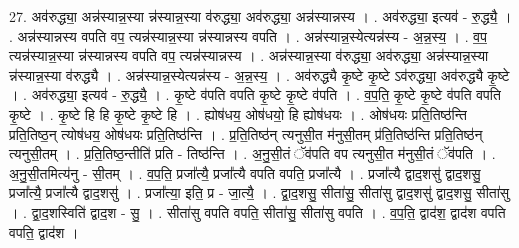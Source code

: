 \documentclass[17pt]{extarticle}
\begin{document}
27. अव॑रुद्ध्या॒ अन्न॑स्यान्न॒स्या न्न॑स्यान्न॒स्या व॑रुद्ध्या॒ अव॑रुद्ध्या॒ अन्न॑स्यान्नस्य । . अव॑रुद्ध्या॒ इत्यव॑ - रु॒द्ध्यै॒ । . अन्न॑स्यान्नस्य वपति वप॒ त्यन्न॑स्यान्न॒स्या न्न॑स्यान्नस्य वपति । . अन्न॑स्यान्न॒स्येत्यन्न॑स्य - अ॒न्न॒स्य॒ । . व॒प॒ त्यन्न॑स्यान्न॒स्या न्न॑स्यान्नस्य वपति वप॒ त्यन्न॑स्यान्नस्य । . अन्न॑स्यान्न॒स्या व॑रुद्ध्या॒ अव॑रुद्ध्या॒ अन्न॑स्यान्न॒स्या न्न॑स्यान्न॒स्या व॑रुद्ध्यै । . अन्न॑स्यान्न॒स्येत्यन्न॑स्य - अ॒न्न॒स्य॒ । . अव॑रुद्ध्यै कृ॒ष्टे कृ॒ष्टे ऽव॑रुद्ध्या॒ अव॑रुद्ध्यै कृ॒ष्टे । . अव॑रुद्ध्या॒ इत्यव॑ - रु॒द्ध्यै॒ । . कृ॒ष्टे व॑पति वपति कृ॒ष्टे कृ॒ष्टे व॑पति । . व॒प॒ति॒ कृ॒ष्टे कृ॒ष्टे व॑पति वपति कृ॒ष्टे । . कृ॒ष्टे हि हि कृ॒ष्टे कृ॒ष्टे हि । . ह्योष॑धय॒ ओष॑धयो॒ हि ह्योष॑धयः । . ओष॑धयः प्रति॒तिष्ठ॑न्ति प्रति॒तिष्ठ॒न् त्योष॑धय॒ ओष॑धयः प्रति॒तिष्ठ॑न्ति । . प्र॒ति॒तिष्ठ॑न् त्यनुसी॒त म॑नुसी॒तम् प्र॑ति॒तिष्ठ॑न्ति प्रति॒तिष्ठ॑न् त्यनुसी॒तम् । . प्र॒ति॒तिष्ठ॒न्तीति॑ प्रति - तिष्ठ॑न्ति । . अ॒नु॒सी॒तं ॅव॑पति वप त्यनुसी॒त म॑नुसी॒तं ॅव॑पति । . अ॒नु॒सी॒तमित्य॑नु - सी॒तम् । . व॒प॒ति॒ प्रजा᳚त्यै॒ प्रजा᳚त्यै वपति वपति॒ प्रजा᳚त्यै । . प्रजा᳚त्यै द्वाद॒शसु॑ द्वाद॒शसु॒ प्रजा᳚त्यै॒ प्रजा᳚त्यै द्वाद॒शसु॑ । . प्रजा᳚त्या॒ इति॒ प्र - जा॒त्यै॒ । . द्वा॒द॒शसु॒ सीता॑सु॒ सीता॑सु द्वाद॒शसु॑ द्वाद॒शसु॒ सीता॑सु । . द्वा॒द॒शस्विति॑ द्वाद॒श - सु॒ । . सीता॑सु वपति वपति॒ सीता॑सु॒ सीता॑सु वपति । . व॒प॒ति॒ द्वाद॑श॒ द्वाद॑श वपति वपति॒ द्वाद॑श । \newline
\end{document}
